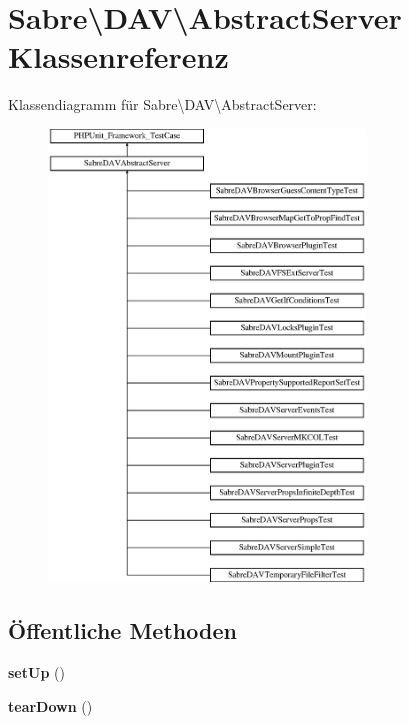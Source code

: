 \hypertarget{class_sabre_1_1_d_a_v_1_1_abstract_server}{}\section{Sabre\textbackslash{}D\+AV\textbackslash{}Abstract\+Server Klassenreferenz}
\label{class_sabre_1_1_d_a_v_1_1_abstract_server}
Klassendiagramm für Sabre\textbackslash{}D\+AV\textbackslash{}Abstract\+Server\+:\begin{figure}[H]
\begin{center}
\leavevmode
\includegraphics[height=12.000000cm]{class_sabre_1_1_d_a_v_1_1_abstract_server}
\end{center}
\end{figure}
\subsection*{Öffentliche Methoden}
\begin{DoxyCompactItemize}
\item 
\mbox{\label{class_sabre_1_1_d_a_v_1_1_abstract_server_a4380ec26eaf2c149ad9e7811e1a77622}} 
{\bfseries set\+Up} ()
\item 
\mbox{\label{class_sabre_1_1_d_a_v_1_1_abstract_server_adbd459a49b2dd6d00fd42535a40c6c41}} 
{\bfseries tear\+Down} ()
\end{DoxyCompactItemize}
